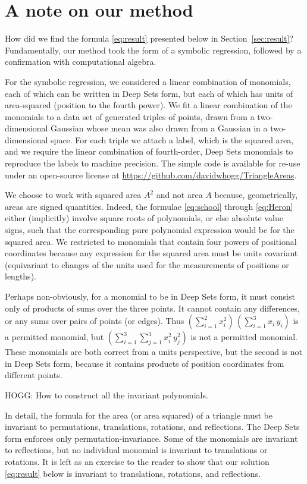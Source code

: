 \documentclass[12pt]{article}
\newcommand{\sectionname}{Section}
\newcommand{\secref}[1]{\sectionname~\ref{#1}}
\begin{document}
\section{A note on our method}\label{sec:method}
How did we find the formula \eqref{eq:result} presented below in \secref{sec:result}?
Fundamentally, our method took the form of a symbolic regression, followed by a confirmation with computational algebra.

For the symbolic regression, we considered a linear combination of monomials, each of which can be written in Deep Sets form, but each of which has units of area-squared (position to the fourth power).
We fit a linear combination of the monomials to a data set of generated triples of points, drawn from a two-dimensional Gaussian whose mean was also drawn from a Gaussian in a two-dimensional space.
For each triple we attach a label, which is the squared area, and we require the linear combination of fourth-order, Deep Sets monomials to reproduce the labels to machine precision.
The simple code is available for re-use under an open-source license at \url{https://github.com/davidwhogg/TriangleAreas}.

We choose to work with squared area $A^2$ and not area $A$ because, geometrically, areas are signed quantities.
Indeed, the formulae \eqref{eq:school} through \eqref{eq:Heron} either (implicitly) involve square roots of polynomials, or else absolute value signs, such that the corresponding pure polynomial expression would be for the squared area.
We restricted to monomials that contain four powers of positional coordinates because any expression for the squared area must be units covariant (equivariant to changes of the units used for the measurements of positions or lengths).

Perhaps non-obviously, for a monomial to be in Deep Sets form, it must consist only of products of sums over the three points.
It cannot contain any differences, or any sums over pairs of points (or edges).
Thus $(\sum_{i=1}^2 x_i^2)\,(\sum_{i=1}^3 x_i\,y_i)$ is a permitted monomial, but $(\sum_{i=1}^3\sum_{j=1}^3 x_i^2\,y_j^2)$ is not a permitted monomial.
These monomials are both correct from a units perspective, but the second is not in Deep Sets form, because it contains products of position coordinates from different points.

HOGG: How to construct all the invariant polynomials.

In detail, the formula for the area (or area squared) of a triangle must be invariant to permutations, translations, rotations, and reflections.
The Deep Sets form enforces only permutation-invariance.
Some of the monomials are invariant to reflections, but no individual monomial is invariant to translations or rotations.
It is left as an exercise to the reader to show that our solution \eqref{eq:result} below is invariant to translations, rotations, and reflections.
\end{document}
